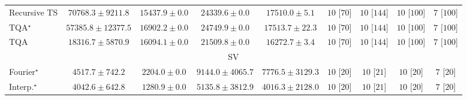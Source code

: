 \begin{tabular}{l|cccc|cccc|}
Recursive TS & {\cellcolor[HTML]{004F2D}} \color[HTML]{F1F1F1} $70768.3\pm 9211.8$ & {\cellcolor[HTML]{FEFFDF}} \color[HTML]{000000} $15437.9\pm 0.0$ & {\cellcolor[HTML]{EDF8B1}} \color[HTML]{000000} $24339.6\pm 0.0$ & {\cellcolor[HTML]{FCFED3}} \color[HTML]{000000} $17510.0\pm 5.1$ & {\cellcolor[HTML]{49006A}} \color[HTML]{F1F1F1} $10$ [$70$] & {\cellcolor[HTML]{49006A}} \color[HTML]{F1F1F1} $10$ [$144$] & {\cellcolor[HTML]{49006A}} \color[HTML]{F1F1F1} $10$ [$100$] & {\cellcolor[HTML]{CD238F}} \color[HTML]{F1F1F1} $7$ [$100$] \\
TQA$^\star$ & {\cellcolor[HTML]{278946}} \color[HTML]{F1F1F1} $57385.8\pm 12377.5$ & {\cellcolor[HTML]{FCFED7}} \color[HTML]{000000} $16902.2\pm 0.0$ & {\cellcolor[HTML]{EBF7B0}} \color[HTML]{000000} $24749.9\pm 0.0$ & {\cellcolor[HTML]{FCFED3}} \color[HTML]{000000} $17513.7\pm 22.3$ & {\cellcolor[HTML]{49006A}} \color[HTML]{F1F1F1} $10$ [$70$] & {\cellcolor[HTML]{49006A}} \color[HTML]{F1F1F1} $10$ [$144$] & {\cellcolor[HTML]{49006A}} \color[HTML]{F1F1F1} $10$ [$100$] & {\cellcolor[HTML]{CD238F}} \color[HTML]{F1F1F1} $7$ [$100$] \\
TQA & {\cellcolor[HTML]{FBFDCE}} \color[HTML]{000000} $18316.7\pm 5870.9$ & {\cellcolor[HTML]{FDFEDB}} \color[HTML]{000000} $16094.1\pm 0.0$ & {\cellcolor[HTML]{F7FCBA}} \color[HTML]{000000} $21509.8\pm 0.0$ & {\cellcolor[HTML]{FDFEDA}} \color[HTML]{000000} $16272.7\pm 3.4$ & {\cellcolor[HTML]{49006A}} \color[HTML]{F1F1F1} $10$ [$70$] & {\cellcolor[HTML]{49006A}} \color[HTML]{F1F1F1} $10$ [$144$] & {\cellcolor[HTML]{49006A}} \color[HTML]{F1F1F1} $10$ [$100$] & {\cellcolor[HTML]{CD238F}} \color[HTML]{F1F1F1} $7$ [$100$] \\
\cline{1-9}
\multicolumn{9}{c}{\rule{0pt}{8pt}SV} \\
\midrule
Fourier$^\star$ & {\cellcolor[HTML]{97B7D7}} \color[HTML]{000000} $4517.7\pm 742.2$ & {\cellcolor[HTML]{EDE8F3}} \color[HTML]{000000} $2204.0\pm 0.0$ & {\cellcolor[HTML]{023858}} \color[HTML]{F1F1F1} $9144.0\pm 4065.7$ & {\cellcolor[HTML]{04629A}} \color[HTML]{F1F1F1} $7776.5\pm 3129.3$ & {\cellcolor[HTML]{49006A}} \color[HTML]{F1F1F1} $10$ [$20$] & {\cellcolor[HTML]{49006A}} \color[HTML]{F1F1F1} $10$ [$21$] & {\cellcolor[HTML]{49006A}} \color[HTML]{F1F1F1} $10$ [$20$] & {\cellcolor[HTML]{CD238F}} \color[HTML]{F1F1F1} $7$ [$20$] \\
Interp.$^\star$ & {\cellcolor[HTML]{AFC1DD}} \color[HTML]{000000} $4042.6\pm 642.8$ & {\cellcolor[HTML]{FFF7FB}} \color[HTML]{000000} $1280.9\pm 0.0$ & {\cellcolor[HTML]{78ABD0}} \color[HTML]{F1F1F1} $5135.8\pm 3812.9$ & {\cellcolor[HTML]{AFC1DD}} \color[HTML]{000000} $4016.3\pm 2128.0$ & {\cellcolor[HTML]{49006A}} \color[HTML]{F1F1F1} $10$ [$20$] & {\cellcolor[HTML]{49006A}} \color[HTML]{F1F1F1} $10$ [$21$] & {\cellcolor[HTML]{49006A}} \color[HTML]{F1F1F1} $10$ [$20$] & {\cellcolor[HTML]{CD238F}} \color[HTML]{F1F1F1} $7$ [$20$] \\

\end{tabular}
